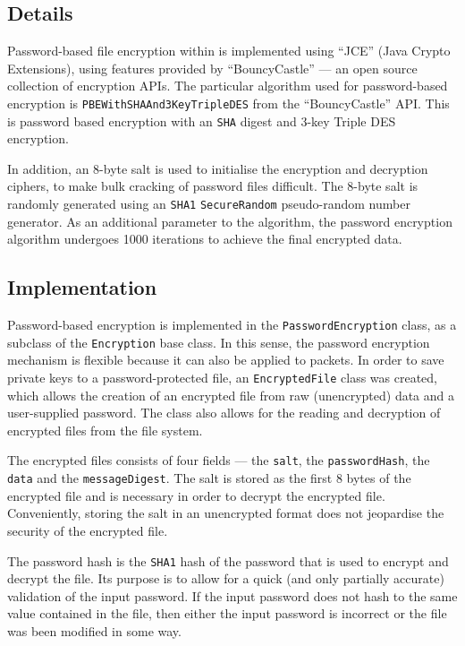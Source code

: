 \documentclass[a4paper,11pt]{article}
\begin{document}
\subsection{Details}
Password-based file encryption within \packageName{} is implemented using
``JCE'' (Java Crypto Extensions), using features provided by ``BouncyCastle''
--- an open source collection of encryption APIs. The particular algorithm used
for password-based encryption is \verb+PBEWithSHAAnd3KeyTripleDES+ from the
``BouncyCastle'' API. This is password based encryption with an \verb+SHA+
digest and 3-key Triple DES encryption.

In addition, an 8-byte salt is used to initialise the encryption and decryption
ciphers, to make bulk cracking of password files difficult. The 8-byte salt is
randomly generated using an \verb+SHA1+ \verb+SecureRandom+ pseudo-random
number generator. As an additional parameter to the algorithm, the password
encryption algorithm undergoes 1000 iterations to achieve the final encrypted
data.

\subsection{Implementation}
Password-based encryption is implemented in the \verb+PasswordEncryption+ class,
as a subclass of the \verb+Encryption+ base class. In this sense, the password
encryption mechanism is flexible because it can also be applied to
\serviceName{} packets. In order to save private keys to a password-protected
file, an \verb+EncryptedFile+ class was created, which allows the creation of
an encrypted file from raw (unencrypted) data and a user-supplied password. The
class also allows for the reading and decryption of encrypted files from the
file system.

The encrypted files consists of four fields --- the \verb+salt+, the
\verb+passwordHash+, the \verb+data+ and the \verb+messageDigest+. The salt is
stored as the first 8 bytes of the encrypted file and is necessary in order to
decrypt the encrypted file. Conveniently, storing the salt in an unencrypted
format does not jeopardise the security of the encrypted file.

The password hash is the \verb+SHA1+ hash of the password that is used to
encrypt and decrypt the file. Its purpose is to allow for a quick (and only
partially accurate) validation of the input password. If the input password does
not hash to the same value contained in the file, then either the input password
is incorrect or the file was been modified in some way.
\end{document}
